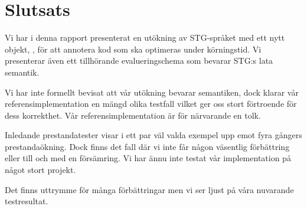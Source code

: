\documentclass[Rapport]{subfiles}
\begin{document}
\chapter{Slutsats}
\label{sec:Slutsats}






Vi har i denna rapport presenterat en utökning av STG-språket med ett nytt objekt, , för att annotera kod som ska optimeras under körningstid. Vi presenterar även ett tillhörande evalueringschema som bevarar STG:s lata semantik. 

Vi har inte formellt bevisat att vår utökning bevarar semantiken, dock klarar vår referensimplementation en mängd olika testfall vilket ger oss stort förtroende för dess korrekthet. Vår referensimplementation är för närvarande en tolk. 

Inledande prestandatester visar i ett par väl valda exempel upp emot fyra gångers prestandaökning. Dock finns det fall där vi inte får någon väsentlig förbättring eller till och med en försämring. Vi har ännu inte testat vår implementation på något stort projekt. 

Det finns uttrymme för många förbättringar men vi ser ljust på våra nuvarande testresultat.





\end{document}
